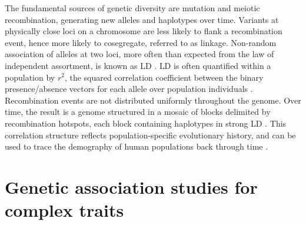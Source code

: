 \begin{outline}
The fundamental sources of genetic diversity are mutation and meiotic recombination, generating new alleles and haplotypes over time.
Variants at physically close loci on a chromosome are less likely to flank a recombination event, hence more likely to cosegregate, referred to as linkage.
Non-random association of alleles at two loci, more often than expected from the law of independent assortment, is known as \gls{LD} \autocite{slatkin2008LinkageDisequilibriumUnderstanding}.
\gls{LD} is often quantified within a population by $r^2$, the squared correlation coefficient between the binary presence/absence vectors for each allele over population individuals \autocite{slatkin2008LinkageDisequilibriumUnderstanding}.
Recombination events are not distributed uniformly throughout the genome.
Over time, the result is a genome structured in a mosaic of blocks delimited by recombination hotspots, each block containing haplotypes in strong \gls{LD} \autocite{wall2003HaplotypeBlocksLinkage,theinternationalhapmapconsortium2007SecondGenerationHuman}.
This correlation structure reflects population-specific evolutionary history, and can be used to trace the demography of human populations back through time \autocite{karczewski2020AnalyticTranslationalGenetics}.

\section{Genetic association studies for complex traits}


\end{outline}
